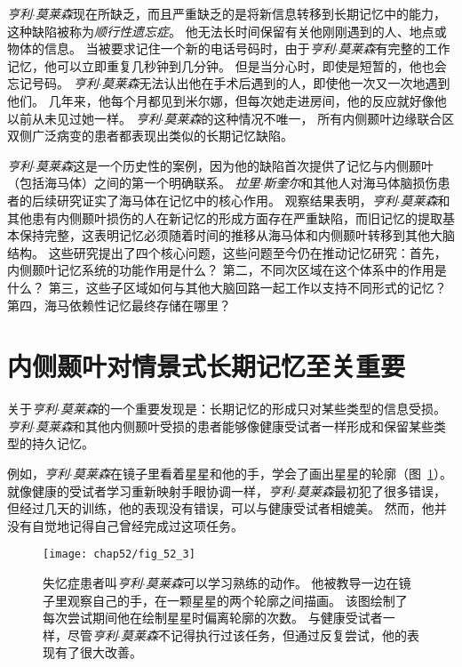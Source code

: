 \textit{亨利$\cdot$莫莱森}现在所缺乏，而且严重缺乏的是将新信息转移到长期记忆中的能力，这种缺陷被称为\textit{顺行性遗忘症}。
他无法长时间保留有关他刚刚遇到的人、地点或物体的信息。
当被要求记住一个新的电话号码时，由于\textit{亨利$\cdot$莫莱森}有完整的工作记忆，他可以立即重复几秒钟到几分钟。
但是当分心时，即使是短暂的，他也会忘记号码。
\textit{亨利$\cdot$莫莱森}无法认出他在手术后遇到的人，即使他一次又一次地遇到他们。
几年来，他每个月都见到米尔娜，但每次她走进房间，他的反应就好像他以前从未见过她一样。
\textit{亨利$\cdot$莫莱森}的这种情况不唯一，
所有内侧颞叶边缘联合区双侧广泛病变的患者都表现出类似的长期记忆缺陷。


\textit{亨利$\cdot$莫莱森}这是一个历史性的案例，因为他的缺陷首次提供了记忆与内侧颞叶（包括海马体）之间的第一个明确联系。
\textit{拉里$\cdot$斯奎尔}和其他人对海马体脑损伤患者的后续研究证实了海马体在记忆中的核心作用。
观察结果表明，\textit{亨利$\cdot$莫莱森}和其他患有内侧颞叶损伤的人在新记忆的形成方面存在严重缺陷，而旧记忆的提取基本保持完整，这表明记忆必须随着时间的推移从海马体和内侧颞叶转移到其他大脑结构。
这些研究提出了四个核心问题，这些问题至今仍在推动记忆研究：首先，内侧颞叶记忆系统的功能作用是什么？
第二，不同次区域在这个体系中的作用是什么？
第三，这些子区域如何与其他大脑回路一起工作以支持不同形式的记忆？
第四，海马依赖性记忆最终存储在哪里？



\section{内侧颞叶对情景式长期记忆至关重要}

关于\textit{亨利$\cdot$莫莱森}的一个重要发现是：长期记忆的形成只对某些类型的信息受损。
\textit{亨利$\cdot$莫莱森}和其他内侧颞叶受损的患者能够像健康受试者一样形成和保留某些类型的持久记忆。


例如，\textit{亨利$\cdot$莫莱森}在镜子里看着星星和他的手，学会了画出星星的轮廓（图~\ref{fig:52_3}）。
就像健康的受试者学习重新映射手眼协调一样，\textit{亨利$\cdot$莫莱森}最初犯了很多错误，但经过几天的训练，他的表现没有错误，可以与健康受试者相媲美。
然而，他并没有自觉地记得自己曾经完成过这项任务。


\begin{figure}[htbp]
	\centering
	\texttt{[image: chap52/fig\_52\_3]}
	\caption{失忆症患者叫\textit{亨利$\cdot$莫莱森}可以学习熟练的动作。
		他被教导一边在镜子里观察自己的手，在一颗星星的两个轮廓之间描画。
		该图绘制了每次尝试期间他在绘制星星时偏离轮廓的次数。
		与健康受试者一样，尽管\textit{亨利$\cdot$莫莱森}不记得执行过该任务，但通过反复尝试，他的表现有了很大改善\cite{blakemore1977mechanics}。}
	\label{fig:52_3}
\end{figure}


